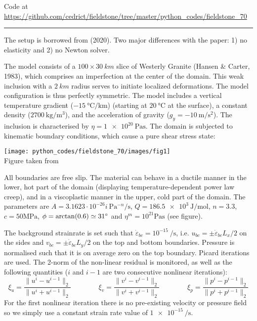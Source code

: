 

\begin{center}
Code at \url{https://github.com/cedrict/fieldstone/tree/master/python_codes/fieldstone_70}
\end{center}

\par\noindent\rule{\textwidth}{0.4pt}


The setup is borrowed from \textcite{dudy20} (2020). 
Two major differences with the paper: 1) no elasticity and 2) no Newton solver.

The model consists of a $100\times 30~\si{km}$ slice of Westerly Granite (Hansen \& Carter, 1983), 
which comprises an imperfection at the center of the domain.
This weak inclusion with a $\SI{2}{km}$ radius serves to initiate
localized deformations. The model configuration is thus perfectly symmetric. 
The model includes a vertical temperature gradient ($-15~\si{\celsius\per\km}$) (starting 
at $20~\si{\celsius}$ at the surface), a constant density ($\SI{2700}{\kg\per\cubic\metre}$), 
and the acceleration of gravity ($g_y=-\SI{10}{\metre\per\second\squared}$).
The inclusion is characterised by $\eta=\SI{1e20}{\pascal\second}$.
The domain is subjected to kinematic boundary conditions, which cause a pure shear stress state:

\begin{center}
\texttt{[image: python\_codes/fieldstone\_70/images/fig1]}\\
{\captionfont Figure taken from \cite{dudy20}}
\end{center}

All boundaries are free slip. The material can behave in a ductile manner in the lower, hot
part of the domain (displaying temperature-dependent power law creep), and in a viscoplastic 
manner in the upper, cold part of the domain. The parameters are 
$A=3.1623\cdot 10^{-26}i~\si{\pascal^{-n}\per\second}$, 
$Q=\SI{186.5e3}{\joule\per\mole}$, 
$n=3.3$, $c=50\si{\mega\pascal}$, $\phi=\arctan(0.6)\simeq 31\degree$ and 
$\eta^{m}=10^{21}\si{\pascal\second}$ (see figure).

The background strainrate is set such that $\dot{\varepsilon}_{bc}=10^{-15}~\si{\per\second}$, i.e. 
$u_{bc}=\pm \dot{\varepsilon}_{bc} L_x/2$ on the sides and $v_{bc}=\pm \dot{\varepsilon}_{bc} L_y/2 $
on the top and bottom boundaries. Pressure is normalised such that it is on average zero on the top boundary. 
Picard iterations are used. The 2-norm of the non-linear residual 
is monitored, as well as the following quantities ($i$ and $i-1$ are two consecutive nonlinear iterations):
\[
\xi_u = \frac{\|u^i-u^{i-1}\|_2}{ \|u^i+u^{i-1}\|_2}
\qquad
\qquad
\xi_v = \frac{\|v^i-v^{i-1}\|_2}{ \|v^i+v^{i-1}\|_2}
\qquad
\qquad
\xi_p = \frac{\|p^i-p^{i-1}\|_2}{ \|p^i+p^{i-1}\|_2}
\] 
For the first nonlinear iteration there is no pre-existing velocity or pressure field so 
we simply use a constant strain rate value of $\SI{1e-15}{\per\second}$.


